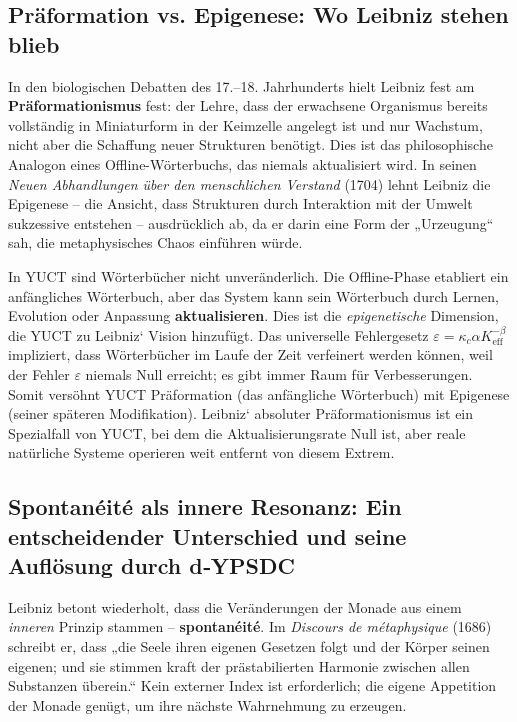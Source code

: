 \documentclass[12pt,a4paper]{article}
\begin{document}
	\subsection{Präformation vs. Epigenese: Wo Leibniz stehen blieb}
	
	In den biologischen Debatten des 17.–18. Jahrhunderts hielt Leibniz fest am \textbf{Präformationismus} fest: der Lehre, dass der erwachsene Organismus bereits vollständig in Miniaturform in der Keimzelle angelegt ist und nur Wachstum, nicht aber die Schaffung neuer Strukturen benötigt. Dies ist das philosophische Analogon eines Offline-Wörterbuchs, das niemals aktualisiert wird. In seinen \emph{Neuen Abhandlungen über den menschlichen Verstand} (1704) lehnt Leibniz die Epigenese – die Ansicht, dass Strukturen durch Interaktion mit der Umwelt sukzessive entstehen – ausdrücklich ab, da er darin eine Form der „Urzeugung“ sah, die metaphysisches Chaos einführen würde.
	
	In YUCT sind Wörterbücher nicht unveränderlich. Die Offline-Phase etabliert ein anfängliches Wörterbuch, aber das System kann sein Wörterbuch durch Lernen, Evolution oder Anpassung \textbf{aktualisieren}. Dies ist die \emph{epigenetische} Dimension, die YUCT zu Leibniz‘ Vision hinzufügt. Das universelle Fehlergesetz \(\varepsilon = \kappa_c \alpha K_{\mathrm{eff}}^{-\beta}\) impliziert, dass Wörterbücher im Laufe der Zeit verfeinert werden können, weil der Fehler \(\varepsilon\) niemals Null erreicht; es gibt immer Raum für Verbesserungen. Somit versöhnt YUCT Präformation (das anfängliche Wörterbuch) mit Epigenese (seiner späteren Modifikation). Leibniz‘ absoluter Präformationismus ist ein Spezialfall von YUCT, bei dem die Aktualisierungsrate Null ist, aber reale natürliche Systeme operieren weit entfernt von diesem Extrem.
	
	\subsection{Spontanéité als innere Resonanz: Ein entscheidender Unterschied und seine Auflösung durch d‑YPSDC}
	
	Leibniz betont wiederholt, dass die Veränderungen der Monade aus einem \emph{inneren} Prinzip stammen – \textbf{spontanéité}. Im \emph{Discours de métaphysique} (1686) schreibt er, dass „die Seele ihren eigenen Gesetzen folgt und der Körper seinen eigenen; und sie stimmen kraft der prästabilierten Harmonie zwischen allen Substanzen überein.“ Kein externer Index ist erforderlich; die eigene Appetition der Monade genügt, um ihre nächste Wahrnehmung zu erzeugen.
	
\end{document}
